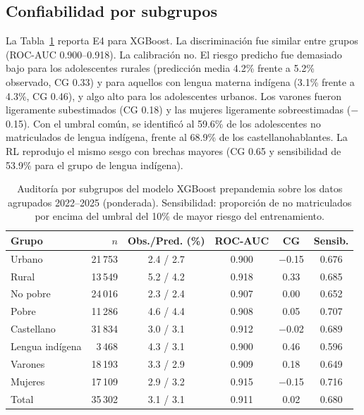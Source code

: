 \documentclass[conference]{IEEEtran}
\begin{document}
\subsection{Confiabilidad por subgrupos}
La Tabla~\ref{tab:sub} reporta E4 para XGBoost. La discriminación fue similar entre grupos (ROC-AUC 0.900--0.918). La calibración no. El riesgo predicho fue demasiado bajo para los adolescentes rurales (predicción media 4.2\% frente a 5.2\% observado, CG 0.33) y para aquellos con lengua materna indígena (3.1\% frente a 4.3\%, CG 0.46), y algo alto para los adolescentes urbanos. Los varones fueron ligeramente subestimados (CG 0.18) y las mujeres ligeramente sobreestimadas ($-$0.15). Con el umbral común, se identificó al 59.6\% de los adolescentes no matriculados de lengua indígena, frente al 68.9\% de los castellanohablantes. La RL reprodujo el mismo sesgo con brechas mayores (CG 0.65 y sensibilidad de 53.9\% para el grupo de lengua indígena).

\begin{table}[t]
\caption{Auditoría por subgrupos del modelo XGBoost prepandemia sobre los datos agrupados 2022--2025 (ponderada). Sensibilidad: proporción de no matriculados por encima del umbral del 10\% de mayor riesgo del entrenamiento.}
\label{tab:sub}
\centering
\setlength{\tabcolsep}{3.2pt}
\footnotesize
\begin{tabular}{lrcccc}
\toprule
Grupo & $n$ & Obs./Pred. (\%) & ROC-AUC & CG & Sensib. \\
\midrule
Urbano & 21\,753 & 2.4 / 2.7 & 0.900 & $-$0.15 & 0.676 \\
Rural & 13\,549 & 5.2 / 4.2 & 0.918 & 0.33 & 0.685 \\
No pobre & 24\,016 & 2.3 / 2.4 & 0.907 & 0.00 & 0.652 \\
Pobre & 11\,286 & 4.6 / 4.4 & 0.908 & 0.05 & 0.707 \\
Castellano & 31\,834 & 3.0 / 3.1 & 0.912 & $-$0.02 & 0.689 \\
Lengua indígena & 3\,468 & 4.3 / 3.1 & 0.900 & 0.46 & 0.596 \\
Varones & 18\,193 & 3.3 / 2.9 & 0.909 & 0.18 & 0.649 \\
Mujeres & 17\,109 & 2.9 / 3.2 & 0.915 & $-$0.15 & 0.716 \\
\midrule
Total & 35\,302 & 3.1 / 3.1 & 0.911 & 0.02 & 0.680 \\
\bottomrule
\end{tabular}
\end{table}
\end{document}
